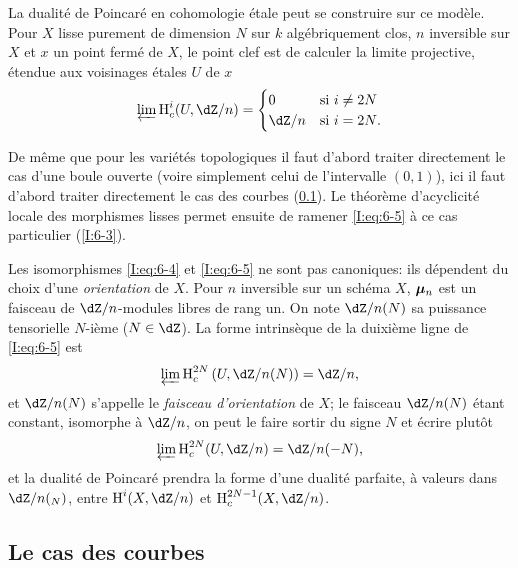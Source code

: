 La dualité de Poincaré en cohomologie étale peut se construire sur ce 
modèle. Pour $X$ lisse purement de dimension $N$ sur $k$ algébriquement clos, 
$n$ inversible sur $X$ et $x$ un point fermé de $X$, le point clef est de 
calculer la limite projective, étendue aux voisinages étales $U$ de $x$ 
\begin{equation}\label{I:eq:6-5}
  \varprojlim \h_c^i(U,\dZ/n) 
    = \begin{cases}
        0     & \text{si $i\ne 2N$} \\
        \dZ/n & \text{si $i=2N$.}
      \end{cases} 
\end{equation}

De même que pour les variétés topologiques il faut d'abord traiter 
directement le cas d'une boule ouverte (voire simplement celui de l'intervalle 
$(0,1)$), ici il faut d'abord traiter directement le cas des courbes 
(\ref{I:6-2}). Le théorème d'acyclicité locale des morphismes lisses 
permet ensuite de ramener \eqref{I:eq:6-5} à ce cas particulier (\ref{I:6-3}). 

Les isomorphismes \eqref{I:eq:6-4} et \eqref{I:eq:6-5} ne sont pas canoniques: 
ils dépendent du choix d'une \emph{orientation} de $X$. Pour $n$ inversible 
sur un schéma $X$, ${\bm\mu}_n$ est un faisceau de $\dZ/n$-modules libres de rang 
un. On note $\dZ/n(N)$ sa puissance tensorielle $N$-ième ($N\in\dZ$). La 
forme intrinsèque de la duixième ligne de \eqref{I:eq:6-5} est 
\begin{equation}\label{I:eq:6-5'}
  \varprojlim \h_c^{2N} \left(U,\dZ/n(N)\right) = \dZ/n \text{,}
\end{equation}
et $\dZ/n(N)$ s'appelle le \emph{faisceau d'orientation} de $X$; le faisceau 
$\dZ/n(N)$ étant constant, isomorphe à $\dZ/n$, on peut le faire sortir 
du signe $N$ et écrire plutôt
\begin{equation}\label{I:eq:6-5''}
  \varprojlim \h_c^{2N} (U,\dZ/n) = \dZ/n(-N) \text{,}
\end{equation}
et la dualité de Poincaré prendra la forme d'une dualité parfaite, à 
valeurs dans $\dZ/n(_N)$, entre $\h^i(X,\dZ/n)$ et $\h_c^{2N-1}(X,\dZ/n)$. 










\subsection{Le cas des courbes}\label{I:6-2}





